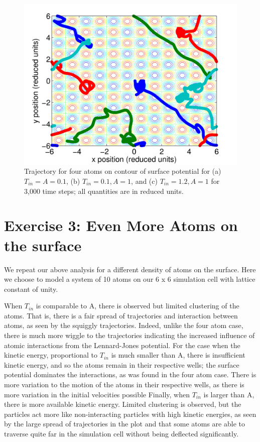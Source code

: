 \documentclass[12pt, oneside]{article}
\begin{document}
\begin{figure}
\begin{minipage}[!htbp]{.5\linewidth}
\includegraphics[width=\textwidth]{./figs/ex2-4n-acon1-tin1p2-3e3.png}
\subcaption{}
\end{minipage}
\caption{Trajectory for four atoms on contour of surface potential for (a) $T_{in} = A = 0.1$, (b) $T_{in} = 0.1, A = 1$, and (c) $T_{in} = 1.2, A = 1$ for 3,000 time steps; all quantities are in reduced units.}
\label{fig:trajmult}
\end{figure}

\section{Exercise 3: Even More Atoms on the surface}

We repeat our above analysis for a different density of atoms on the surface. Here we choose to model a system of 10 atoms on our 6 x 6 simulation cell with lattice constant of unity.

When $T_{in}$ is comparable to A, there is observed but limited clustering of the atoms. That is, there is a fair spread of trajectories and interaction between atoms, as seen by the squiggly trajectories. Indeed, unlike the four atom case, there is much more wiggle to the trajectories indicating the increased influence of atomic interactions from the Lennard-Jones potential. For the case when the kinetic energy, proportional to $T_{in}$ is much smaller than A, there is insufficient kinetic energy, and so the atoms remain in their respective wells; the surface potential dominates the interactions, as was found in the four atom case. There is more variation to the motion of the atoms in their respective wells, as there is more variation in the initial velocities possible Finally, when $T_{in}$ is larger than A, there is more available kinetic energy. Limited clustering is observed, but the particles act more like non-interacting particles with high kinetic energies, as seen by the large spread of trajectories in the plot and that some atoms are able to traverse quite far in the simulation cell without being deflected significantly. 
\end{document}
